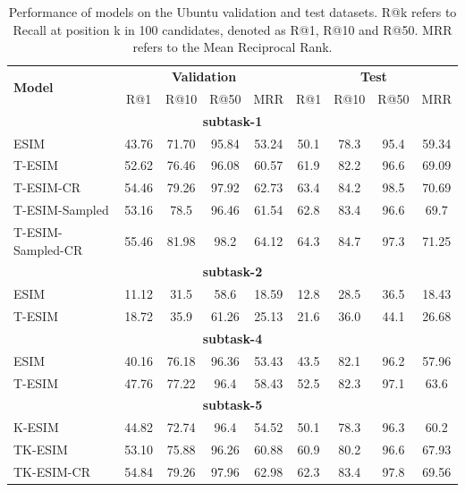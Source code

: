 \documentclass[letterpaper]{article} %
\begin{document}
\begin{table}[htbp!]
\begin{center}
\begin{tabular}{lcccc|cccc}
\hline
\multirow{2}{*}{\textbf{Model}} & \multicolumn{4}{c}{\textbf{Validation}} & \multicolumn{4}{c}{\textbf{Test}}\\
& R@1 & R@10 & R@50 & MRR & R@1 & R@10 & R@50 & MRR  \\ \hline
\multicolumn{9}{c}{\textbf{subtask-1}}\\\hline
ESIM & 43.76 & 71.70 & 95.84 & 53.24 &  50.1 & 78.3 & 95.4 & 59.34 \\ \hline
T-ESIM & 52.62 & 76.46 & 96.08 & 60.57 & 61.9 & 82.2 & 96.6 & 69.09\\ \hline
T-ESIM-CR & 54.46 & 79.26 & 97.92 & 62.73 & 63.4 & 84.2 & 98.5 & 70.69\\ \hline
T-ESIM-Sampled & 53.16 & 78.5 & 96.46 & 61.54 & 62.8 & 83.4 & 96.6 & 69.7\\ \hline
T-ESIM-Sampled-CR & 55.46 & 81.98 & 98.2 & 64.12 & 64.3 & 84.7 & 97.3 & 71.25\\ \hline
\multicolumn{9}{c}{\textbf{subtask-2}}\\\hline
ESIM & 11.12 & 31.5 & 58.6 & 18.59 &  12.8 & 28.5 & 36.5 & 18.43 \\ \hline
T-ESIM & 18.72 & 35.9 & 61.26 & 25.13 & 21.6 & 36.0 & 44.1 & 26.68 \\ \hline
\multicolumn{9}{c}{\textbf{subtask-4}}\\\hline
ESIM & 40.16 & 76.18 & 96.36 & 53.43 &  43.5 & 82.1 & 96.2 & 57.96 \\ \hline
T-ESIM & 47.76 & 77.22 & 96.4 & 58.43 & 52.5 & 82.3 & 97.1 & 63.6 \\ \hline
\multicolumn{9}{c}{\textbf{subtask-5}}\\\hline
K-ESIM & 44.82 & 72.74 & 96.4 & 54.52 &  50.1 & 78.3 & 96.3 & 60.2 \\ \hline
TK-ESIM & 53.10 & 75.88 & 96.26 & 60.88 & 60.9 & 80.2 & 96.6 & 67.93 \\ \hline
TK-ESIM-CR & 54.84 & 79.26 & 97.96 & 62.98 & 62.3 & 83.4 & 97.8 & 69.56\\ \hline

\end{tabular}
\end{center}
\caption{Performance of models on the Ubuntu validation and test datasets. R@k refers to Recall at position k in 100 candidates, denoted as R@1, R@10 and R@50. MRR refers to the Mean Reciprocal Rank.}
\label{tab:baseline-results-ubuntu}
\end{table}
\end{document}
